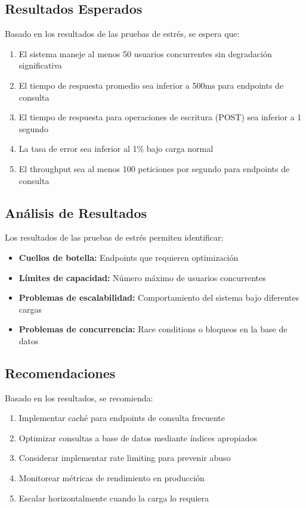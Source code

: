 \documentclass[12pt,a4paper]{article}
\begin{document}
\subsection{Resultados Esperados}

Basado en los resultados de las pruebas de estrés, se espera que:

\begin{enumerate}
    \item El sistema maneje al menos 50 usuarios concurrentes sin degradación significativa
    \item El tiempo de respuesta promedio sea inferior a 500ms para endpoints de consulta
    \item El tiempo de respuesta para operaciones de escritura (POST) sea inferior a 1 segundo
    \item La tasa de error sea inferior al 1\% bajo carga normal
    \item El throughput sea al menos 100 peticiones por segundo para endpoints de consulta
\end{enumerate}

\subsection{Análisis de Resultados}

Los resultados de las pruebas de estrés permiten identificar:

\begin{itemize}
    \item \textbf{Cuellos de botella:} Endpoints que requieren optimización
    \item \textbf{Límites de capacidad:} Número máximo de usuarios concurrentes
    \item \textbf{Problemas de escalabilidad:} Comportamiento del sistema bajo diferentes cargas
    \item \textbf{Problemas de concurrencia:} Race conditions o bloqueos en la base de datos
\end{itemize}

\subsection{Recomendaciones}

Basado en los resultados, se recomienda:

\begin{enumerate}
    \item Implementar caché para endpoints de consulta frecuente
    \item Optimizar consultas a base de datos mediante índices apropiados
    \item Considerar implementar rate limiting para prevenir abuso
    \item Monitorear métricas de rendimiento en producción
    \item Escalar horizontalmente cuando la carga lo requiera
\end{enumerate}
\end{document}
